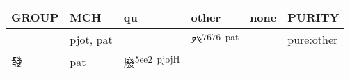\documentclass[14pt,a4paper]{scrartcl}
\begin{document}
\begin{longtable}[c]{@{}llllll@{}}
\toprule
\begin{minipage}[b]{0.14\columnwidth}\raggedright\strut
GROUP
\strut\end{minipage} &
\begin{minipage}[b]{0.14\columnwidth}\raggedright\strut
MCH
\strut\end{minipage} &
\begin{minipage}[b]{0.14\columnwidth}\raggedright\strut
qu
\strut\end{minipage} &
\begin{minipage}[b]{0.14\columnwidth}\raggedright\strut
other
\strut\end{minipage} &
\begin{minipage}[b]{0.14\columnwidth}\raggedright\strut
none
\strut\end{minipage} &
\begin{minipage}[b]{0.14\columnwidth}\raggedright\strut
PURITY
\strut\end{minipage}\tabularnewline
\midrule
\endhead
\begin{minipage}[t]{0.14\columnwidth}\raggedright\strut
𣥠
\strut\end{minipage} &
\begin{minipage}[t]{0.14\columnwidth}\raggedright\strut
pjot, pat
\strut\end{minipage} &
\begin{minipage}[t]{0.14\columnwidth}\raggedright\strut
\strut\end{minipage} &
\begin{minipage}[t]{0.14\columnwidth}\raggedright\strut
癶\textsuperscript{7676~pat}
\strut\end{minipage} &
\begin{minipage}[t]{0.14\columnwidth}\raggedright\strut
\strut\end{minipage} &
\begin{minipage}[t]{0.14\columnwidth}\raggedright\strut
pure:other
\strut\end{minipage}\tabularnewline
\begin{minipage}[t]{0.14\columnwidth}\raggedright\strut
發
\strut\end{minipage} &
\begin{minipage}[t]{0.14\columnwidth}\raggedright\strut
pat
\strut\end{minipage} &
\begin{minipage}[t]{0.14\columnwidth}\raggedright\strut
廢\textsuperscript{5ee2~pjojH}
\strut\end{minipage} &

\end{longtable}
\end{document}
